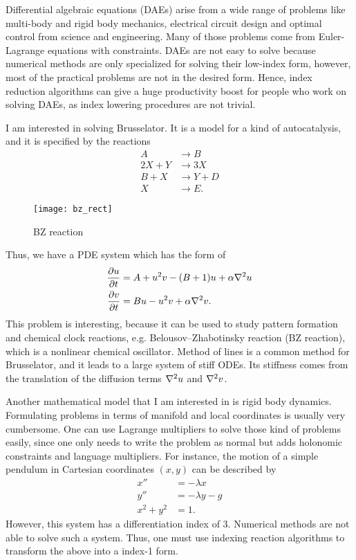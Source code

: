 \documentclass[12pt,a4paper]{article}
\begin{document}
Differential algebraic equations (DAEs) arise from a wide range of problems
like multi-body and rigid body mechanics, electrical circuit design and optimal
control from science and engineering. Many of those problems come from
Euler-Lagrange equations with constraints. DAEs are not easy to solve because
numerical methods are only specialized for solving their low-index form,
however, most of the practical problems are not in the desired form. Hence,
index reduction algorithms can give a huge productivity boost for people who
work on solving DAEs, as index lowering procedures are not trivial.

I am interested in solving Brusselator. It is a model for a kind of
autocatalysis, and it is specified by the reactions
\begin{align*}
  A&\longrightarrow B\\
  2X +  Y&\longrightarrow 3X\\
  B + X&\longrightarrow Y+D\\
  X&\longrightarrow E.
\end{align*}
\begin{wrapfigure}{l}{0.5\textwidth}
  \texttt{[image: bz\_rect]}
  \centering
  \caption{BZ reaction}
\end{wrapfigure}
Thus, we have a PDE system which has the form of
\begin{align}
  \pdv{u}{t} &= A + u^2v - (B+1)u + \alpha \laplacian{u} \\
  \pdv{v}{t} &= Bu - u^2v + \alpha \laplacian{v}.
\end{align}
This problem is interesting, because it can be used to study pattern formation
and chemical clock reactions, e.g. Belousov--Zhabotinsky reaction (BZ
reaction), which is a nonlinear chemical oscillator. Method of lines is a
common method for Brusselator, and it leads to a large system of stiff ODEs.
Its stiffness comes from the translation of the diffusion terms $\laplacian u$
and $\laplacian v$.

Another mathematical model that I am interested in is rigid body dynamics.
Formulating problems in terms of manifold and local coordinates is usually very
cumbersome. One can use Lagrange multipliers to solve those kind of problems
easily, since one only needs to write the problem as normal but adds holonomic
constraints and language multipliers. For instance, the motion of a simple
pendulum in Cartesian coordinates $(x, y)$ can be described by
\begin{align}
  x'' &= -\lambda x \\
  y'' &= -\lambda y - g \\
  x^2 + y^2 &= 1.
\end{align}
However, this system has a differentiation index of 3. Numerical methods are
not able to solve such a system. Thus, one must use indexing reaction
algorithms to transform the above into a index-1 form.
\end{document}

